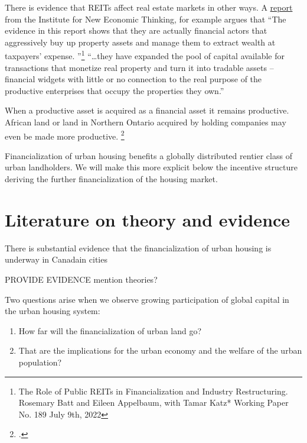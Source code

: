 There is evidence that REITs affect real estate markets in other ways. A \href{https://www.ineteconomics.org/research/research-papers/the-role-of-public-reits-in-financialization-and-industry-restructuring}{report} from the Institute for New Economic Thinking, for example argues that ``The evidence in this report shows that they are actually financial actors that aggressively buy up property assets and manage them to extract wealth at taxpayers’ expense. ''\footnote{The Role of Public REITs in Financialization and Industry Restructuring. Rosemary Batt and Eileen Appelbaum, with Tamar Katz* Working Paper No. 189 July 9th, 2022} ``\dots they have expanded the pool of capital available for transactions that monetize real property and turn it into tradable assets – financial widgets with little or no connection to the real purpose of the productive enterprises that occupy the properties they own.''



When  a productive asset is acquired as a financial asset it remains productive. African land or land in Northern Ontario acquired by holding companies may even be made more productive. 
\footnote{.} 

Financialization of urban housing benefits  a globally distributed rentier class of urban landholders. We will make this more explicit below the incentive structure deriving the further financialization of the housing market.

\section{Literature on theory and evidence}
{\color{red}There is substantial evidence that the financialization of urban housing is underway in Canadain cities

PROVIDE EVIDENCE 	mention theories?}


Two questions arise when we observe growing participation of global capital in the urban housing system: 
\begin{enumerate}
\item How far will the financialization of urban land go? 
\item That are the implications for the urban economy and the welfare of the urban population? 
\end{enumerate}

